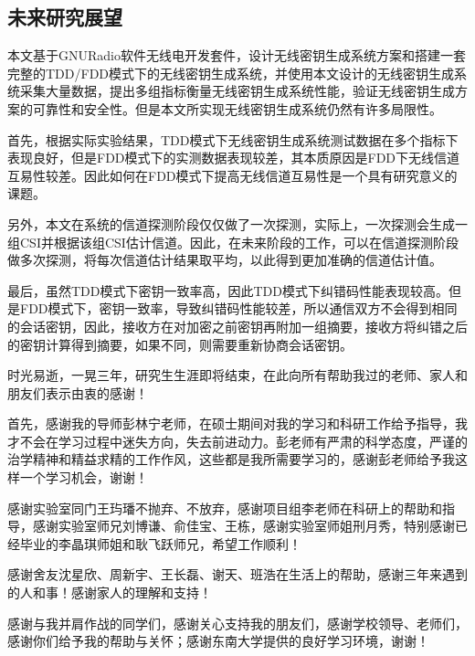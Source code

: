 \documentclass[master]{seuthesis} %
\begin{document}
\begin{Main}
\section{未来研究展望}

本文基于GNURadio软件无线电开发套件，设计无线密钥生成系统方案和搭建一套完整的TDD/FDD模式下的无线密钥生成系统，并使用本文设计的无线密钥生成系统采集大量数据，提出多组指标衡量无线密钥生成系统性能，验证无线密钥生成方案的可靠性和安全性。但是本文所实现无线密钥生成系统仍然有许多局限性。

首先，根据实际实验结果，TDD模式下无线密钥生成系统测试数据在多个指标下表现良好，但是FDD模式下的实测数据表现较差，其本质原因是FDD下无线信道互易性较差。因此如何在FDD模式下提高无线信道互易性是一个具有研究意义的课题。

另外，本文在系统的信道探测阶段仅仅做了一次探测，实际上，一次探测会生成一组CSI并根据该组CSI估计信道。因此，在未来阶段的工作，可以在信道探测阶段做多次探测，将每次信道估计结果取平均，以此得到更加准确的信道估计值。

最后，虽然TDD模式下密钥一致率高，因此TDD模式下纠错码性能表现较高。但是FDD模式下，密钥一致率，导致纠错码性能较差，所以通信双方不会得到相同的会话密钥，因此，接收方在对加密之前密钥再附加一组摘要，接收方将纠错之后的密钥计算得到摘要，如果不同，则需要重新协商会话密钥。

\end{Main} %

\begin{Acknowledgement}{}


时光易逝，一晃三年，研究生生涯即将结束，在此向所有帮助我过的老师、家人和朋友们表示由衷的感谢！

首先，感谢我的导师彭林宁老师，在硕士期间对我的学习和科研工作给予指导，我才不会在学习过程中迷失方向，失去前进动力。彭老师有严肃的科学态度，严谨的治学精神和精益求精的工作作风，这些都是我所需要学习的，感谢彭老师给予我这样一个学习机会，谢谢！

感谢实验室同门王玙璠不抛弃、不放弃，感谢项目组李老师在科研上的帮助和指导，感谢实验室师兄刘博谦、俞佳宝、王栋，感谢实验室师姐刑月秀，特别感谢已经毕业的李晶琪师姐和耿飞跃师兄，希望工作顺利！

感谢舍友沈星欣、周新宇、王长磊、谢天、班浩在生活上的帮助，感谢三年来遇到的人和事！感谢家人的理解和支持！

感谢与我并肩作战的同学们，感谢关心支持我的朋友们，感谢学校领导、老师们，感谢你们给予我的帮助与关怀；感谢东南大学提供的良好学习环境，谢谢！


\end{Acknowledgement}





\newpage
\printindex %



% 
% 
\end{document}
